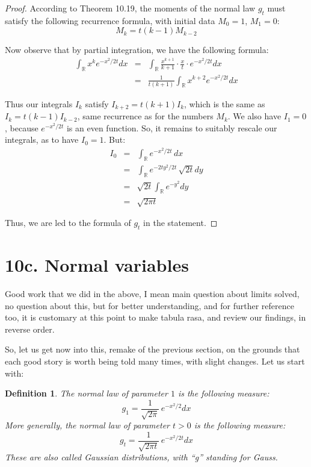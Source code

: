 \documentclass[12pt]{amsbook}
\newtheorem{definition}[theorem]{Definition}
\begin{document}
\begin{proof}
According to Theorem 10.19, the moments of the normal law $g_t$ must satisfy the following recurrence formula, with initial data $M_0=1$, $M_1=0$:
$$M_k=t(k-1)M_{k-2}$$

Now observe that by partial integration, we have the following formula:
\begin{eqnarray*}
\int_\mathbb Rx^ke^{-x^2/2t}dx
&=&\int_\mathbb R\frac{x^{k+1}}{k+1}\cdot\frac{x}{t}\cdot e^{-x^2/2t}dx\\
&=&\frac{1}{t(k+1)}\int_\mathbb Rx^{k+2}e^{-x^2/2t}dx
\end{eqnarray*}

Thus our integrals $I_k$ satisfy $I_{k+2}=t(k+1)I_k$, which is the same as $I_k=t(k-1)I_{k-2}$, same recurrence as for the numbers $M_k$. We also have $I_1=0$, because $e^{-x^2/2t}$ is an even function. So, it remains to suitably rescale our integrals, as to have $I_0=1$. But:
\begin{eqnarray*}
I_0
&=&\int_\mathbb Re^{-x^2/2t}\,dx\\
&=&\int_\mathbb Re^{-2ty^2/2t}\,\sqrt{2t}dy\\
&=&\sqrt{2t}\int_\mathbb Re^{-y^2}dy\\
&=&\sqrt{2\pi t}
\end{eqnarray*}

Thus, we are led to the formula of $g_t$ in the statement.
\end{proof}

\section*{10c. Normal variables}

Good work that we did in the above, I mean main question about limits solved, no question about this, but for better understanding, and for further reference too, it is customary at this point to make tabula rasa, and review our findings, in reverse order. 

\bigskip

So, let us get now into this, remake of the previous section, on the grounds that each good story is worth being told many times, with slight changes. Let us start with:

\begin{definition}
The normal law of parameter $1$ is the following measure:
$$g_1=\frac{1}{\sqrt{2\pi}}\,e^{-x^2/2}dx$$
More generally, the normal law of parameter $t>0$ is the following measure:
$$g_t=\frac{1}{\sqrt{2\pi t}}\,e^{-x^2/2t}dx$$
These are also called Gaussian distributions, with ``g'' standing for Gauss.
\end{definition}
\end{document}
